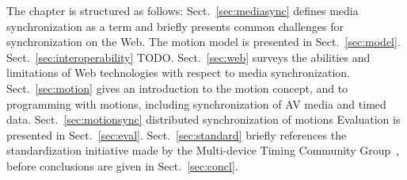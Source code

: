 The chapter is structured as follows: Sect.~\ref{sec:mediasync} defines media
synchronization as a term and briefly presents common challenges for
synchronization on the Web. The motion model is presented in
Sect.~\ref{sec:model}. 
Sect.~\ref{sec:interoperability} TODO.
Sect.~\ref{sec:web} surveys the abilities and limitations of Web technologies with respect to media synchronization.
Sect.~\ref{sec:motion} gives an introduction to the motion concept, and to programming with motions, including synchronization of AV media and timed data.
Sect.~\ref{sec:motionsync} distributed
synchronization of motions
Evaluation is presented in Sect.~\ref{sec:eval}.
Sect.~\ref{sec:standard} briefly references the standardization initiative
made by the Multi-device Timing Community Group~\cite{mtcg}, before
conclusions are given in Sect.~\ref{sec:concl}.
